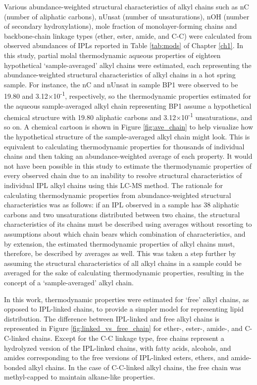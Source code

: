 Various abundance-weighted structural characteristics of alkyl chains such as nC (number of aliphatic carbons), nUnsat (number of unsaturations), nOH (number of secondary hydroxylations), mole fraction of monolayer-forming chains and backbone-chain linkage types (ether, ester, amide, and C-C) were calculated from observed abundances of IPLs reported in Table \ref{tab:mods} of Chapter \ref{ch1}. In this study, partial molal thermodynamic aqueous properties of eighteen hypothetical `sample-averaged' alkyl chains were estimated, each representing the abundance-weighted structural characteristics of alkyl chains in a hot spring sample. For instance, the nC and nUnsat in sample BP1 were observed to be 19.80 and 3.12$\times$10\textsuperscript{-1}, respectively, so the thermodynamic properties estimated for the aqueous sample-averaged alkyl chain representing BP1 assume a hypothetical chemical structure with 19.80 aliphatic carbons and 3.12$\times$10\textsuperscript{-1} unsaturations, and so on. A chemical cartoon is shown in Figure \ref{fig:ave_chain} to help visualize how the hypothetical structure of the sample-averaged alkyl chain might look. This is equivalent to calculating thermodynamic properties for thousands of individual chains and then taking an abundance-weighted average of each property. It would not have been possible in this study to estimate the thermodynamic properties of every observed chain due to an inability to resolve structural characteristics of individual IPL alkyl chains using this LC-MS method. The rationale for calculating thermodynamic properties from abundance-weighted structural characteristics was as follows: if an IPL observed in a sample has 38 aliphatic carbons and two unsaturations distributed between two chains, the structural characteristics of its chains must be described using averages without resorting to assumptions about which chain bears which combination of characteristics, and by extension, the estimated thermodynamic properties of alkyl chains must, therefore, be described by averages as well. This was taken a step further by assuming the structural characteristics of all alkyl chains in a sample could be averaged for the sake of calculating thermodynamic properties, resulting in the concept of a `sample-averaged' alkyl chain.

In this work, thermodynamic properties were estimated for `free' alkyl chains, as opposed to IPL-linked chains, to provide a simpler model for representing lipid distribution. The difference between IPL-linked and free alkyl chains is represented in Figure \ref{fig:linked_vs_free_chain} for ether-, ester-, amide-, and C-C-linked chains. Except for the C-C linkage type, free chains represent a hydrolyzed version of the IPL-linked chains, with fatty acids, alcohols, and amides corresponding to the free versions of IPL-linked esters, ethers, and amide-bonded alkyl chains. In the case of C-C-linked alkyl chains, the free chain was methyl-capped to maintain alkane-like properties.



